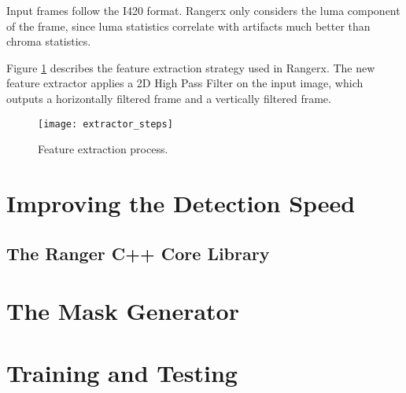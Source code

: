 Input frames follow the I420 format. Rangerx only considers the luma component of the frame, since luma statistics correlate with artifacts much better than chroma statistics.

Figure \ref{fig:extractor_steps} describes the feature extraction strategy used in Rangerx. The new feature extractor applies a 2D High Pass Filter on the input image, which outputs a horizontally filtered frame and a vertically filtered frame.

\begin{figure} [!h]
  \centering
  
  \texttt{[image: extractor\_steps]}
  
  \caption{Feature extraction process. }
  \label{fig:extractor_steps}

\end{figure}

\section{Improving the Detection Speed}
\label{sec:sol_speed}

\subsection{The Ranger C++ Core Library}
\label{sec:sol_rdf}

\section{The Mask Generator}
\label{sec:sol_maskgen}

\section{Training and Testing}
\label{sec:sol_traintest}


